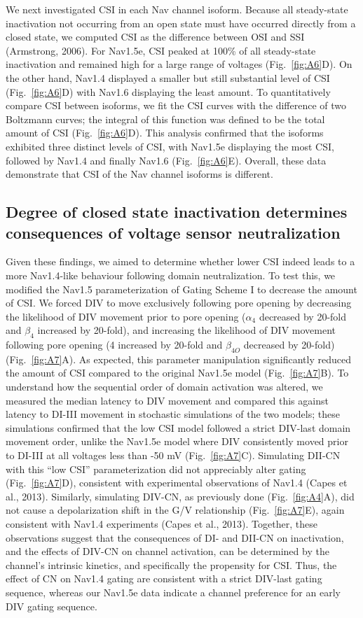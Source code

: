 We next investigated CSI in each Nav channel isoform. Because all steady-state inactivation not occurring from an open state must have occurred directly from a closed state, we computed CSI as the difference between OSI and SSI (Armstrong, 2006). For Nav1.5e, CSI peaked at 100\% of all steady-state inactivation and remained high for a large range of voltages (Fig.~\ref{fig:A6}D). On the other hand, Nav1.4 displayed a smaller but still substantial level of CSI (Fig.~\ref{fig:A6}D) with Nav1.6 displaying the least amount. To quantitatively compare CSI between isoforms, we fit the CSI curves with the difference of two Boltzmann curves; the integral of this function was defined to be the total amount of CSI (Fig.~\ref{fig:A6}D). This analysis confirmed that the isoforms exhibited three distinct levels of CSI, with Nav1.5e displaying the most CSI, followed by Nav1.4 and finally Nav1.6 (Fig.~\ref{fig:A6}E). Overall, these data demonstrate that CSI of the Nav channel isoforms is different.

\subsection{Degree of closed state inactivation determines consequences of voltage sensor neutralization}
Given these findings, we aimed to determine whether lower CSI indeed leads to a more Nav1.4-like behaviour following domain neutralization. To test this, we modified the Nav1.5 parameterization of Gating Scheme I to decrease the amount of CSI. We forced DIV to move exclusively following pore opening by decreasing the likelihood of DIV movement prior to pore opening ($\alpha_4$ decreased by 20-fold and $\beta_4$ increased by 20-fold), and increasing the likelihood of DIV movement following pore opening (4 increased by 20-fold and $\beta_{4O}$ decreased by 20-fold) (Fig.~\ref{fig:A7}A). As expected, this parameter manipulation significantly reduced the amount of CSI compared to the original Nav1.5e model (Fig.~\ref{fig:A7}B). To understand how the sequential order of domain activation was altered, we measured the median latency to DIV movement and compared this against latency to DI-III movement in stochastic simulations of the two models; these simulations confirmed that the low CSI model followed a strict DIV-last domain movement order, unlike the Nav1.5e model where DIV consistently moved prior to DI-III at all voltages less than -50 mV (Fig.~\ref{fig:A7}C).
Simulating DII-CN with this “low CSI” parameterization did not appreciably alter gating (Fig.~\ref{fig:A7}D), consistent with experimental observations of Nav1.4 (Capes et al., 2013). Similarly, simulating DIV-CN, as previously done (Fig.~\ref{fig:A4}A), did not cause a depolarization shift in the G/V relationship (Fig.~\ref{fig:A7}E), again consistent with Nav1.4 experiments (Capes et al., 2013). Together, these observations suggest that the consequences of DI- and DII-CN on inactivation, and the effects of DIV-CN on channel activation, can be determined by the channel’s intrinsic kinetics, and specifically the propensity for CSI. Thus, the effect of CN on Nav1.4 gating are consistent with a strict DIV-last gating sequence, whereas our Nav1.5e data indicate a channel preference for an early DIV gating sequence.

